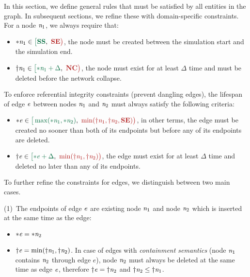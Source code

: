 In this section, we define general rules that must be satisfied by all entities in the graph. In subsequent sections, we refine these with domain-specific constraints.
For a node $\mathit{n}_\mathrm{1}$, we always require that:
\begin{itemize}
    \item $\varcn{1} \in \interval{\xSS}{\xSE}$, the node must be created between the simulation start and the simulation end.
    \item $\vardn{1} \in \interval{\varcn{1} + \Delta}{\xNC}$, the node must exist for at least $\Delta$ time and must be deleted before the network collapse.
\end{itemize}


To enforce referential integrity constraints (\ie prevent dangling edges), the lifespan of edge $\mathit{e}$ between nodes $\mathit{n}_\mathrm{1}$ and $\mathit{n}_\mathrm{2}$ must always satisfy the following criteria:

\begin{itemize}
    \item $ \varc{e} \in \interval
        {\max(\varcn{1}, \varcn{2})}
        {\min(\vardn{1}, \vardn{2}, \xSE)} $,
        in other terms,
        the edge must be created no sooner than both of its endpoints
        but before 
        any of its endpoints are deleted.
    \item $ \vard{e} \in \interval
        {\varc{e} + \Delta}
        {\min(\vardn{1}, \vardn{2})} $,
        \ie the edge must exist for at least $\Delta$ time and
        deleted no later than 
        any of its endpoints.
\end{itemize}

To further refine the constraints for edges, we distinguish between two main cases.

(1)~The endpoints of edge $\mathit{e}$ are existing node $\mathit{n}_\mathrm{1}$ and node $\mathit{n}_\mathrm{2}$ which is inserted at the same time as the edge:
\begin{itemize}
    \item $ {\ast}\mathit{e} = {\ast}\mathit{\mathit{n}_\mathrm{2}} $ %
    \item $ {\dagger}\mathit{e} = \min({\dagger}\mathit{\mathit{n}_\mathrm{1}}, {\dagger}\mathit{\mathit{n}_\mathrm{2}}) $.
    In case of edges with \emph{containment semantics} (node $\mathit{n}_\mathrm{1}$ contains $\mathit{n}_\mathrm{2}$ through edge $e$), 
    node $\mathit{n}_\mathrm{2}$ must always be deleted at the same time as edge $\mathit{e}$,
    therefore
    ${\dagger}\mathit{e} = {\dagger}\mathit{\mathit{n}_\mathrm{2}}$ and ${\dagger}\mathit{\mathit{n}_\mathrm{2}} \leq {\dagger}\mathit{\mathit{n}_\mathrm{1}}$.
\end{itemize}

